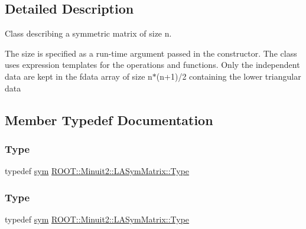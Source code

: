 \subsection{Detailed Description}
Class describing a symmetric matrix of size n.

The size is specified as a run-\/time argument passed in the constructor. The class uses expression templates for the operations and functions. Only the independent data are kept in the fdata array of size n$\ast$(n+1)/2 containing the lower triangular data 

\subsection{Member Typedef Documentation}
\mbox{\label{classROOT_1_1Minuit2_1_1LASymMatrix_a339ed010f480472ba1029aef21c149ea}} 
\subsubsection{\texorpdfstring{Type}{Type}\hspace{0.1cm}{\footnotesize\ttfamily [1/3]}}
{\footnotesize\ttfamily typedef \mbox{\hyperlink{classROOT_1_1Minuit2_1_1sym}{sym}} \mbox{\hyperlink{classROOT_1_1Minuit2_1_1LASymMatrix_a339ed010f480472ba1029aef21c149ea}{R\+O\+O\+T\+::\+Minuit2\+::\+L\+A\+Sym\+Matrix\+::\+Type}}}

\mbox{\label{classROOT_1_1Minuit2_1_1LASymMatrix_a339ed010f480472ba1029aef21c149ea}} 
\subsubsection{\texorpdfstring{Type}{Type}\hspace{0.1cm}{\footnotesize\ttfamily [2/3]}}
{\footnotesize\ttfamily typedef \mbox{\hyperlink{classROOT_1_1Minuit2_1_1sym}{sym}} \mbox{\hyperlink{classROOT_1_1Minuit2_1_1LASymMatrix_a339ed010f480472ba1029aef21c149ea}{R\+O\+O\+T\+::\+Minuit2\+::\+L\+A\+Sym\+Matrix\+::\+Type}}}

\mbox{\label{classROOT_1_1Minuit2_1_1LASymMatrix_a339ed010f480472ba1029aef21c149ea}} 
